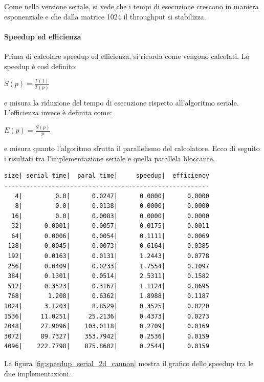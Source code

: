 Come nella versione seriale, si vede che i tempi di esecuzione crescono in maniera esponenziale e che dalla matrice 1024 il throughput si stabilizza.

\paragraph{Speedup ed efficienza}

Prima di calcolare speedup ed efficienza, si ricorda come vengono calcolati. Lo speedup \`{e} cos\`{i} definito:

\vspace{5mm}
$S(p) = \frac{T(1)}{T(p)}$
\vspace{5mm}

e misura la riduzione del tempo di esecuzione rispetto all'algoritmo seriale. L'efficienza invece \`{e} definita come:

\vspace{5mm}
$E(p) = \frac{S(p)}{p}$
\vspace{5mm}

e misura quanto l'algoritmo sfrutta il parallelismo del calcolatore. Ecco di seguito i risultati tra l'implementazione seriale e quella parallela bloccante.

\begin{lstlisting}
size| serial time|  paral time|     speedup|  efficiency
--------------------------------------------------------
   4|         0.0|      0.0247|      0.0000|      0.0000
   8|         0.0|      0.0138|      0.0000|      0.0000
  16|         0.0|      0.0083|      0.0000|      0.0000
  32|      0.0001|      0.0057|      0.0175|      0.0011
  64|      0.0006|      0.0054|      0.1111|      0.0069
 128|      0.0045|      0.0073|      0.6164|      0.0385
 192|      0.0163|      0.0131|      1.2443|      0.0778
 256|      0.0409|      0.0233|      1.7554|      0.1097
 384|      0.1301|      0.0514|      2.5311|      0.1582
 512|      0.3523|      0.3167|      1.1124|      0.0695
 768|       1.208|      0.6362|      1.8988|      0.1187
1024|      3.1203|      8.8529|      0.3525|      0.0220
1536|     11.0251|     25.2136|      0.4373|      0.0273
2048|     27.9096|    103.0118|      0.2709|      0.0169
3072|     89.7327|    353.7942|      0.2536|      0.0159
4096|    222.7798|    875.8602|      0.2544|      0.0159
\end{lstlisting}

La figura \ref{fig:speedup_serial_2d_cannon} mostra il grafico dello speedup tra le due implementazioni.


